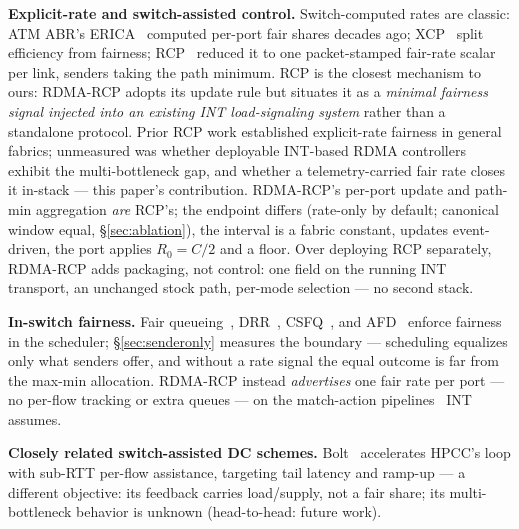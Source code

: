 \documentclass[conference]{IEEEtran}
\newcommand{\hpccfs}{\textsc{RDMA-RCP}\xspace}
\renewcommand{\paragraph}[1]{\par\smallskip\noindent\textbf{#1}\hspace{0.5em}\ignorespaces}
\begin{document}
\paragraph{Explicit-rate and switch-assisted control.} Switch-computed rates are classic:
ATM ABR's ERICA~\cite{kalyanaraman2000erica} computed per-port fair shares decades ago;
XCP~\cite{katabi2002xcp} split efficiency from fairness; RCP~\cite{dukkipati2008rcp} reduced
it to one packet-stamped fair-rate scalar per link, senders taking the path minimum.
RCP is the closest mechanism to ours: \hpccfs adopts its update rule but situates it as a
\emph{minimal fairness signal injected into an existing INT load-signaling system} rather
than a standalone protocol. Prior RCP work established explicit-rate fairness in general
fabrics; unmeasured was whether deployable INT-based RDMA controllers exhibit the
multi-bottleneck gap, and whether a telemetry-carried fair rate closes it in-stack --- this
paper's contribution. \hpccfs's per-port update and path-min aggregation \emph{are} RCP's; the endpoint differs
(rate-only by default; canonical window equal, \S\ref{sec:ablation}), the interval is a
fabric constant, updates event-driven, the port applies $R_0 = C/2$ and a floor. Over deploying RCP separately, \hpccfs adds packaging, not control: one field on the
running INT transport, an unchanged stock path, per-mode selection --- no second stack.

\paragraph{In-switch fairness.} Fair queueing~\cite{demers1989fq}, DRR~\cite{shreedhar1995drr},
CSFQ~\cite{stoica1998csfq}, and AFD~\cite{pan2003afd} enforce fairness in the scheduler;
\S\ref{sec:senderonly} measures the boundary --- scheduling equalizes only what senders
offer, and without a rate signal the equal outcome is far from the max-min allocation.
\hpccfs instead \emph{advertises} one fair rate per port --- no per-flow tracking or
extra queues --- on the match-action pipelines~\cite{bosshart2014p4} INT assumes.

\paragraph{Closely related switch-assisted DC schemes.} Bolt~\cite{arslan2023bolt} accelerates HPCC's loop
with sub-RTT per-flow assistance, targeting tail latency and ramp-up --- a different
objective: its feedback carries load/supply, not a fair share; its multi-bottleneck behavior
is unknown (head-to-head: future work).
\end{document}
